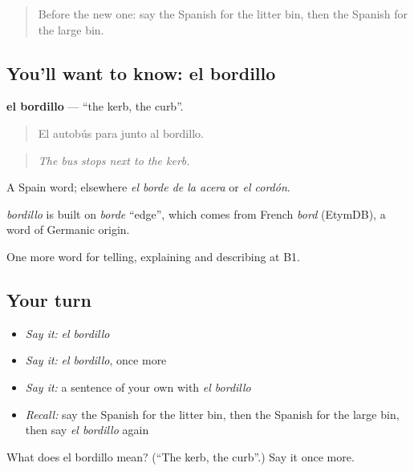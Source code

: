 \begin{quote}
Before the new one: say the Spanish for the litter bin, then the Spanish for the large bin.
\end{quote}

\subsection*{You'll want to know: el bordillo}
\textbf{el bordillo} — \textquotedblleft{}the kerb, the curb\textquotedblright{}.

\begin{quote}
El autobús para junto al bordillo.
\end{quote}

\begin{quote}
\emph{The bus stops next to the kerb.}
\end{quote}

A Spain word; elsewhere \emph{el borde de la acera} or \emph{el cordón}.

\begin{cousinweb}
\emph{bordillo} is built on \emph{borde} \textquotedblleft{}edge\textquotedblright{}, which comes from French \emph{bord} (EtymDB), a word of Germanic origin.
\end{cousinweb}

\begin{grammarlens}[title={What you've built}]
One more word for telling, explaining and describing at B1.
\end{grammarlens}

\subsection*{Your turn}
\begin{itemize}
\raggedright
  \item \emph{Say it:} \emph{el bordillo}
  \item \emph{Say it:} \emph{el bordillo}, once more
  \item \emph{Say it:} a sentence of your own with \emph{el bordillo}
  \item \emph{Recall:} say the Spanish for the litter bin, then the Spanish for the large bin, then say \emph{el bordillo} again
\end{itemize}

\begin{tcolorbox}[breakable,colback=teal!4,colframe=teal!35!black,title={Before you move on}]
What does el bordillo mean? (\textquotedblleft{}The kerb, the curb\textquotedblright{}.) Say it once more.
\end{tcolorbox}
